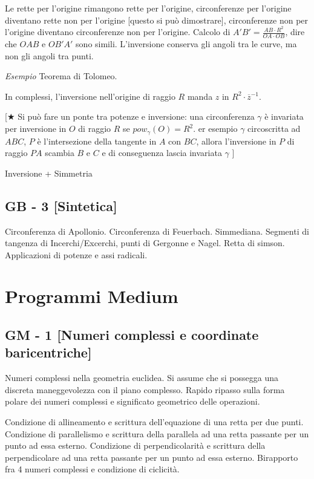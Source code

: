 Le rette per l'origine rimangono rette per l'origine, circonferenze per l'origine diventano rette non per l'origine [questo si può dimostrare], circonferenze non per l'origine diventano circonferenze non per l'origine. Calcolo di $A'B'=\frac{AB\cdot R^2}{OA \cdot OB}$, dire che $OAB$ e $OB'A'$ sono simili. L'inversione conserva gli angoli tra le curve, ma non gli angoli tra punti.

\textit{Esempio} Teorema di Tolomeo.

In complessi, l'inversione nell'origine di raggio $R$ manda $z$ in $R^2\cdot \overline{z}^{-1}$. 


[$\bigstar$ Si può fare un ponte tra potenze e inversione: una circonferenza $\gamma$ è invariata per inversione in $O$ di raggio $R$ se $pow_{\gamma}(O)=R^2$. er esempio $\gamma$ circoscritta ad $ABC$, $P$ è l'intersezione della tangente in $A$ con $BC$, allora l'inversione in $P$ di raggio $PA$ scambia $B$ e $C$ e di conseguenza lascia invariata $\gamma$ ]

\vspace{0.4cm}
Inversione + Simmetria


\subsection{GB - 3 [Sintetica]}
\begin{short}
 Circonferenza di Apollonio. Circonferenza di Feuerbach. Simmediana. Segmenti di tangenza di Incerchi/Excerchi, punti di Gergonne e Nagel. Retta di simson. Applicazioni di potenze e assi radicali. 
\end{short}



\clearpage
\section{Programmi Medium}

\subsection{GM - 1 [Numeri complessi e coordinate baricentriche]}
Numeri complessi nella geometria euclidea. Si assume che si possegga una discreta maneggevolezza con il piano complesso.
Rapido ripasso sulla forma polare dei numeri complessi e significato geometrico delle operazioni.

Condizione di allineamento e scrittura dell'equazione di una retta per due punti. Condizione di parallelismo e scrittura della parallela ad una retta passante per un punto ad essa esterno. Condizione di perpendicolarità e scrittura della perpendicolare ad una retta passante per un punto ad essa esterno. Birapporto fra 4 numeri complessi e condizione di ciclicità.


